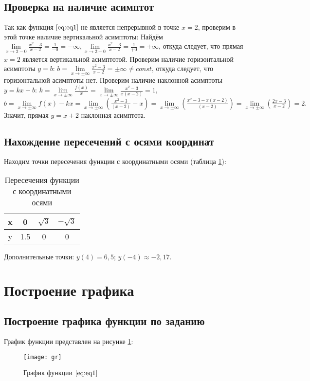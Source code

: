 \subsection{Проверка на наличие асимптот}
Так как функция $\eqref{eq:eq1}$ не является непрерывной в точке $x = 2$, проверим в этой точке наличие вертикальной асимптоты:
Найдём $\lim\limits_{x\to 2-0} \frac{x^2-3}{x-2} = \frac{1}{-0} = -\infty, \lim\limits_{x\to 2+0} \frac{x^2-3}{x-2} = \frac{1}{+0} = +\infty$, откуда следует, что прямая $x = 2$ является вертикальной асимптотой.
Проверим наличие горизонтальной асимптоты $y = b$: $b = \lim\limits_{x\to \pm \infty} \frac{x^2-3}{x-2} =  \pm \infty \neq const$, откуда следует, что горизонтальной асимптоты нет.
Проверим наличие наклонной асимптоты $y = kx + b$: $k = \lim\limits_{x\to \pm \infty} \frac{f(x)}{x} = \lim\limits_{x\to \pm \infty} \frac{x^2-3}{x(x-2)} = 1,$ $b = \lim\limits_{x\to \pm \infty} f(x) - kx = \lim\limits_{x\to \pm \infty} \left(\frac{x^2-3}{(x-2)}-x\right) = \lim\limits_{x\to \pm \infty} \left(\frac{x^2-3-x(x-2)}{(x-2)}\right) = \lim\limits_{x\to \pm \infty}\left(\frac{2x-3}{x-2}\right) = 2.$
Значит, прямая $y = x + 2$ наклонная асимптота.
\subsection{Нахождение пересечений с осями координат}
Находим точки пересечения функции с координатными осями (таблица \ref{tabular:tab1}): 
\begin{table}[H]
	\caption{Пересечения функции с координатными осями}
	\begin{center}
		\begin{tabular}{|c|c|c|c|}
			\hline
			x & 0 & $\sqrt{3}$ & $-\sqrt{3}$ \\ \hline
			y & 1.5 & 0 & 0 \\ \hline
		\end{tabular}
		\label{tabular:tab1}
	\end{center}
\end{table}
Дополнительные точки: $y(4) = 6,5$; $y(-4) \approx -2,17.$
\section{Построение графика}
\subsection{Построение графика функции по заданию}
График функции представлен на рисунке \ref{pic:gr}:
\begin{figure}[H]
	\begin{center}
		\texttt{[image: gr]}
		\caption{График функции $\eqref{eq:eq1}$}
		\label{pic:gr} 
	\end{center}
\end{figure}
